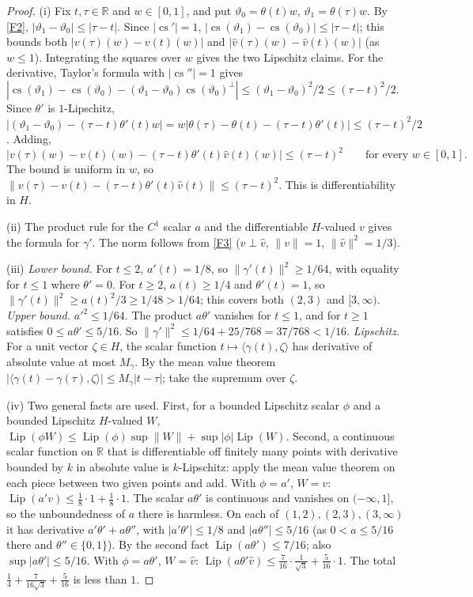 \documentclass[11pt]{article}
\newcommand{\R}{\mathbb R}
\newcommand{\norm}[1]{\lVert #1\rVert}
\newcommand{\ip}[2]{\langle #1,#2\rangle}
\DeclareMathOperator{\Lip}{Lip}
\DeclareMathOperator{\cvec}{cs}
\theoremstyle{definition}
\numberwithin{equation}{section}
\begin{document}
\begin{proof}
(i) Fix \(t,\tau\in\R\) and \(w\in[0,1]\), and put
\(\vartheta_0=\theta(t)w\), \(\vartheta_1=\theta(\tau)w\). By \ref{F2},
\(|\vartheta_1-\vartheta_0|\le|\tau-t|\). Since \(|\cvec'|=1\),
\(|\cvec(\vartheta_1)-\cvec(\vartheta_0)|\le|\tau-t|\); this bounds both
\(|v(\tau)(w)-v(t)(w)|\) and \(|\hat v(\tau)(w)-\hat v(t)(w)|\) (as
\(w\le1\)). Integrating the squares over \(w\) gives the two Lipschitz claims.
For the derivative, Taylor's formula with \(|\cvec''|=1\) gives
\(|\cvec(\vartheta_1)-\cvec(\vartheta_0)
-(\vartheta_1-\vartheta_0)\cvec(\vartheta_0)^\perp|
\le(\vartheta_1-\vartheta_0)^2/2\le(\tau-t)^2/2\). Since \(\theta'\) is
\(1\)-Lipschitz,
\(|(\vartheta_1-\vartheta_0)-(\tau-t)\theta'(t)w|
=w|\theta(\tau)-\theta(t)-(\tau-t)\theta'(t)|\le(\tau-t)^2/2\). Adding,
\[
 \bigl|v(\tau)(w)-v(t)(w)-(\tau-t)\theta'(t)\hat v(t)(w)\bigr|\le(\tau-t)^2
 \qquad\text{for every }w\in[0,1].
\]
The bound is uniform in \(w\), so
\(\norm{v(\tau)-v(t)-(\tau-t)\theta'(t)\hat v(t)}\le(\tau-t)^2\). This is
differentiability in \(H\).

(ii) The product rule for the \(C^1\) scalar \(a\) and the differentiable
\(H\)-valued \(v\) gives the formula for \(\gamma'\). The norm follows from
\ref{F3} (\(v\perp\hat v\), \(\norm{v}=1\), \(\norm{\hat v}^2=1/3\)).

(iii) \emph{Lower bound.} For \(t\le2\), \(a'(t)=1/8\), so
\(\norm{\gamma'(t)}^2\ge1/64\), with equality for \(t\le1\) where
\(\theta'=0\). For \(t\ge2\), \(a(t)\ge1/4\) and \(\theta'(t)=1\), so
\(\norm{\gamma'(t)}^2\ge a(t)^2/3\ge1/48>1/64\); this covers both \((2,3)\)
and \([3,\infty)\). \emph{Upper bound.} \(a'^2\le1/64\). The product
\(a\theta'\) vanishes for \(t\le1\), and for \(t\ge1\) satisfies
\(0\le a\theta'\le5/16\). So
\(\norm{\gamma'}^2\le1/64+25/768=37/768<1/16\). \emph{Lipschitz.} For a unit
vector \(\zeta\in H\), the scalar function \(t\mapsto\ip{\gamma(t)}{\zeta}\)
has derivative of absolute value at most \(M_\gamma\). By the mean value
theorem \(|\ip{\gamma(t)-\gamma(\tau)}{\zeta}|\le M_\gamma|t-\tau|\); take the
supremum over \(\zeta\).

(iv) Two general facts are used. First, for a bounded Lipschitz scalar
\(\phi\) and a bounded Lipschitz \(H\)-valued \(W\),
\(\Lip(\phi W)\le\Lip(\phi)\sup\norm W+\sup|\phi|\Lip(W)\). Second, a
continuous scalar function on \(\R\) that is differentiable off finitely many
points with derivative bounded by \(k\) in absolute value is \(k\)-Lipschitz:
apply the mean value theorem on each piece between two given points and add.
With \(\phi=a'\), \(W=v\): \(\Lip(a'v)\le\frac18\cdot1+\frac18\cdot1\). The
scalar \(a\theta'\) is continuous and vanishes on \((-\infty,1]\), so the
unboundedness of \(a\) there is harmless. On each of
\((1,2),(2,3),(3,\infty)\) it has derivative \(a'\theta'+a\theta''\), with
\(|a'\theta'|\le1/8\) and \(|a\theta''|\le5/16\) (as \(0<a\le5/16\) there and
\(\theta''\in\{0,1\}\)). By the second fact \(\Lip(a\theta')\le7/16\); also
\(\sup|a\theta'|\le5/16\). With \(\phi=a\theta'\), \(W=\hat v\):
\(\Lip(a\theta'\hat v)\le\frac7{16}\cdot\frac1{\sqrt3}+\frac5{16}\cdot1\). The
total \(\frac14+\frac{7}{16\sqrt3}+\frac5{16}\) is less than \(1\).


\end{proof}
\end{document}
